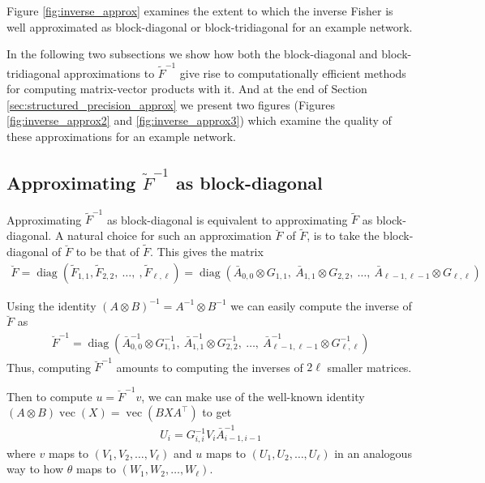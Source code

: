 \documentclass[12pt]{article}
\newcommand{\ovec}{\operatorname{vec}}
\newcommand{\diag}{\operatorname{diag}}
\begin{document}
Figure \ref{fig:inverse_approx} examines the extent to which the inverse Fisher is well approximated as block-diagonal or block-tridiagonal for an example network.

In the following two subsections we show how both the block-diagonal and block-tridiagonal approximations to $\tilde{F}^{-1}$ give rise to computationally efficient methods for computing matrix-vector products with it.  And at the end of Section \ref{sec:structured_precision_approx} we present two figures (Figures \ref{fig:inverse_approx2} and \ref{fig:inverse_approx3}) which examine the quality of these approximations for an example network.


\subsection{Approximating $\tilde{F}^{-1}$ as block-diagonal}
\label{sec:blockdiag_approx}

Approximating $\tilde{F}^{-1}$ as block-diagonal is equivalent to approximating $\tilde{F}$ as block-diagonal.  A natural choice for such an approximation $\breve{F}$ of $\tilde{F}$, is to take the block-diagonal of $\breve{F}$ to be that of $\tilde{F}$. This gives the matrix
\begin{align*}
\breve{F} = \diag\left( \tilde{F}_{1,1}, \tilde{F}_{2,2}, \: \ldots, \:, \tilde{F}_{\ell,\ell} \right) = \diag\left( \bar{A}_{0,0} \otimes G_{1,1}, \: \bar{A}_{1,1} \otimes G_{2,2}, \: \ldots, \: \bar{A}_{\ell-1,\ell-1} \otimes G_{\ell,\ell} \right)
\end{align*}

Using the identity $(A \otimes B)^{-1} = A^{-1} \otimes B^{-1}$ we can easily compute the inverse of $\breve{F}$ as
\begin{align*}
\breve{F}^{-1} = \diag\left( \bar{A}_{0,0}^{-1} \otimes G_{1,1}^{-1}, \: \bar{A}_{1,1}^{-1} \otimes G_{2,2}^{-1}, \: \ldots, \: \bar{A}_{\ell-1,\ell-1}^{-1} \otimes G_{\ell,\ell}^{-1} \right)
\end{align*}
Thus, computing $\breve{F}^{-1}$ amounts to computing the inverses of $2\ell$ smaller matrices.

Then to compute $u = \breve{F}^{-1}v$, we can make use of the well-known identity $(A \otimes B) \ovec(X) = \ovec( B X A^\top )$ to get
\begin{align*}
U_i = G_{i,i}^{-1} V_i \bar{A}_{i-1,i-1}^{-1}
\end{align*}
where $v$ maps to $(V_1, V_2,\ldots, V_\ell)$ and $u$ maps to $(U_1, U_2, \ldots, U_\ell)$ in an analogous way to how $\theta$ maps to $(W_1, W_2, \ldots, W_\ell)$.
\end{document}
